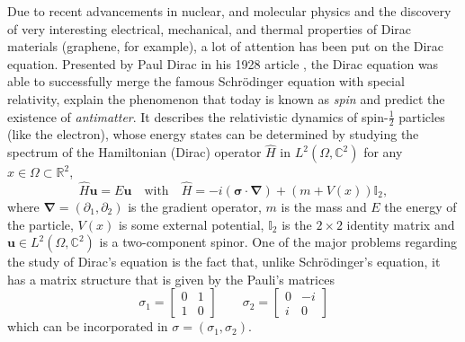 Due to recent advancements in nuclear, and molecular physics and the discovery of very interesting electrical, mechanical, and thermal properties of Dirac materials (graphene, for example), a lot of attention has been put on the Dirac equation. Presented by Paul Dirac in his 1928 article \cite{dirac1928quantum}, the Dirac equation was able to successfully merge the famous Schr\"{o}dinger equation with special relativity, explain the phenomenon that today is known as \textit{spin} and predict the existence of \textit{antimatter}.
It describes the relativistic dynamics of spin-$\frac{1}{2}$ particles (like the electron), whose energy states can be determined by studying the spectrum of the Hamiltonian (Dirac) operator \(\hat{H}\) in \(L^2(\Omega, \mathbb{C}^2)\) for any \(x \in \Omega \subset \mathbb{R}^2\),
\begin{equation}\label{dirac_eq}
    \hat{H} \mathbf{u} = E \mathbf{u} \quad \text{with} \quad \hat{H}= -i (\mathbf{\sigma} \cdot \mathbf{\nabla}) + \left(m + V(x)\right) \mathbb{I}_2,
\end{equation}
where \(\mathbf{\nabla} = (\partial_1, \partial_2) \) is the gradient operator, \(m\) is the mass and \(E\) the energy of the particle, \(V(x)\) is some external potential, \(\mathbb{I}_2\) is the \(2\times 2\) identity matrix and \(\mathbf{u} \in L^2(\Omega, \mathbb{C}^2)\) is a two-component spinor. One of the major problems regarding the study of Dirac's equation is the fact that, unlike Schr\"{o}dinger's equation, it has a matrix structure that is given by the Pauli's matrices
\[
\sigma_1 = \begin{bmatrix}
    0 & 1\\
    1 & 0
\end{bmatrix} \qquad \sigma_2 = \begin{bmatrix}
    0 & -i\\
    i & 0
\end{bmatrix}
\]
which can be incorporated in \(\sigma = (\sigma_1, \sigma_2)\).

